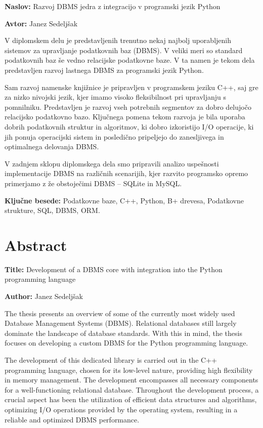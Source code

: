 \documentclass[a4paper,12pt,openright]{book}
\newcommand{\ttitle}{Razvoj DBMS jedra z integracijo v programski jezik Python}
\newcommand{\ttitleEn}{Development of a DBMS core with integration into the Python programming language}
\newcommand{\tauthor}{Janez Sedeljšak}
\newcommand{\tkeywords}{Podatkovne baze, C++, Python, B+ drevesa, Podatkovne strukture, SQL, DBMS, ORM}
\newcommand{\clearemptydoublepage}{\newpage{\pagestyle{empty}\cleardoublepage}}
\begin{document}
\noindent\textbf{Naslov:} \ttitle
\bigskip

\noindent\textbf{Avtor:} \tauthor
\bigskip

\noindent V diplomskem delu je predstavljenih trenutno nekaj najbolj uporabljenih sistemov za upravljanje podatkovnih baz (DBMS). V veliki meri so standard podatkovnih baz še vedno relacijske podatkovne baze. V ta namen je tekom dela predstavljen razvoj lastnega DBMS za programski jezik Python.

Sam razvoj namenske knjižnice je pripravljen v programskem jeziku C++, saj gre za nizko nivojski jezik, kjer imamo visoko fleksibilnost pri upravljanju s pomnilniku. Predstavljen je razvoj vseh potrebnih segmentov za dobro delujočo relacijsko podatkovno bazo. Ključnega pomena tekom razvoja je bila uporaba dobrih podatkovnih struktur in algoritmov, ki dobro izkoristijo I/O operacije, ki jih ponuja operacijski sistem in posledično pripeljejo do zanesljivega in optimalnega delovanja DBMS.

V zadnjem sklopu diplomskega dela smo pripravili analizo uspešnosti implementacije DBMS na različnih scenarijih, kjer razvito programsko opremo primerjamo z že obstoječimi DBMS – SQLite in MySQL.
\bigskip

\noindent\textbf{Ključne besede:} \tkeywords.
\clearemptydoublepage

{}
\chapter*{Abstract}

\noindent\textbf{Title:} \ttitleEn
\bigskip

\noindent\textbf{Author:} \tauthor
\bigskip

\noindent The thesis presents an overview of some of the currently most widely used Database Management Systems (DBMS). Relational databases still largely dominate the landscape of database standards. With this in mind, the thesis focuses on developing a custom DBMS for the Python programming language.

The development of this dedicated library is carried out in the C++ programming language, chosen for its low-level nature, providing high flexibility in memory management. The development encompasses all necessary components for a well-functioning relational database. Throughout the development process, a crucial aspect has been the utilization of efficient data structures and algorithms, optimizing I/O operations provided by the operating system, resulting in a reliable and optimized DBMS performance.
\end{document}
